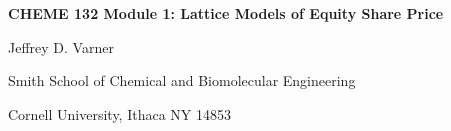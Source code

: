 \documentclass[11pt]{article}
\makeatletter
\theoremstyle{definition}
\renewcommand\subsection{\@startsection
	{subsection}{2}{0mm}
	{-0.05in}
	{-0.5\baselineskip}
	{\normalfont\normalsize\bfseries}}
\makeatother
\begin{document}
{\par\centering\textbf{\Large CHEME 132 Module 1: Lattice Models of Equity Share Price}}
\vspace{0.2in}
{\par \centering \large{Jeffrey D. Varner}}
\vspace{0.05in}
{\par \centering \large{Smith School of Chemical and Biomolecular Engineering}}
{\par \centering \large{Cornell University, Ithaca NY 14853}}

\date{}
\thispagestyle{empty}

\setcounter{page}{1}



\end{document}
